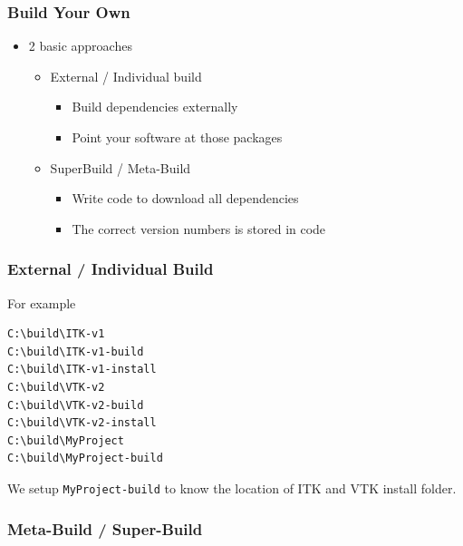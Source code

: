 \subsubsection{Build Your Own}\label{build-your-own}

\begin{itemize}
\itemsep1pt\parskip0pt
\item
  2 basic approaches

  \begin{itemize}
  \itemsep1pt\parskip0pt
  \item
    External / Individual build

    \begin{itemize}
    \itemsep1pt\parskip0pt
    \item
      Build dependencies externally
    \item
      Point your software at those packages
    \end{itemize}
  \item
    SuperBuild / Meta-Build

    \begin{itemize}
    \itemsep1pt\parskip0pt
    \item
      Write code to download all dependencies
    \item
      The correct version numbers is stored in code
    \end{itemize}
  \end{itemize}
\end{itemize}

\subsubsection{External / Individual
Build}\label{external-individual-build}

For example

\begin{verbatim}
C:\build\ITK-v1
C:\build\ITK-v1-build
C:\build\ITK-v1-install
C:\build\VTK-v2
C:\build\VTK-v2-build
C:\build\VTK-v2-install
C:\build\MyProject
C:\build\MyProject-build
\end{verbatim}

We setup \texttt{MyProject-build} to know the location of ITK and VTK
install folder.

\subsubsection{Meta-Build / Super-Build}\label{meta-build-super-build}


